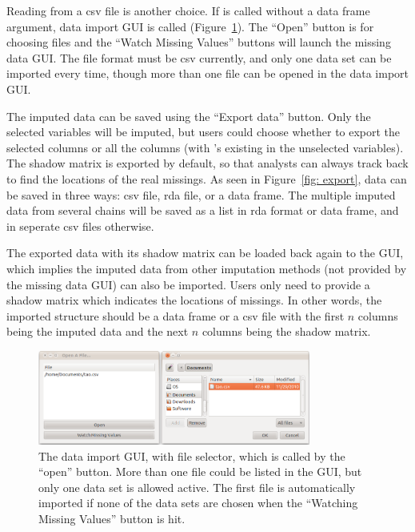 \documentclass[article]{jss}
\begin{document}
Reading from a csv file is another choice.  If  is called without a data frame argument, data import GUI is called (Figure~\ref{fig: import}). The ``Open'' button is for choosing files and the ``Watch Missing Values'' buttons will launch the missing data GUI. The file format must be csv currently, and only one data set can be imported every time, though more than one file can be opened in the data import GUI.

The imputed data can be saved using the ``Export data'' button. Only the selected variables will be imputed, but users could choose whether to export the selected columns or all the columns (with 's existing in the unselected variables). The shadow matrix is exported by default, so that analysts can always track back to find the locations of the real missings. As seen in Figure~\ref{fig: export}, data can be saved in three ways: csv file, rda file, or a data frame. The multiple imputed data from several chains will be saved as a list in rda format or data frame, and in seperate csv files otherwise.

The exported data with its shadow matrix can be loaded back again to the GUI, which implies the imputed data from other imputation methods (not provided by the missing data GUI) can also be imported. Users only need to provide a shadow matrix which indicates the locations of missings. In other words, the imported structure should be a data frame or a csv file with the first $n$ columns being the imputed data and the next $n$ columns being the shadow matrix.


\begin{center}
\begin{figure}[h]
\begin{centering}
\includegraphics[width=0.8\textwidth]{graph/fig6-open}
\par\end{centering}
\caption{The data import GUI, with file selector, which is called by the ``open'' button. More than one file could be listed in the GUI, but only one data set is allowed active. The first file is automatically imported if none of the data sets are chosen when the ``Watching Missing Values'' button is hit.}
\label{fig: import}
\end{figure}
\par\end{center}
\end{document}
